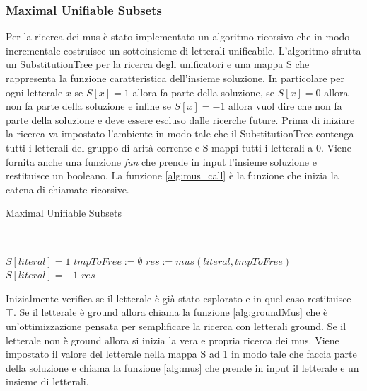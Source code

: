 \documentclass[./main.tex]{subfiles}
\begin{document}
\subsubsection{Maximal Unifiable Subsets}

Per la ricerca dei mus è stato implementato un algoritmo ricorsivo che in modo incrementale costruisce un sottoinsieme di letterali unificabile.
L'algoritmo sfrutta un SubstitutionTree per la ricerca degli unificatori e una mappa S che rappresenta la funzione caratteristica 
dell'insieme soluzione. 
In particolare per ogni letterale $x$ se $S[x] = 1$ allora fa parte della soluzione, se $S[x] = 0$ allora non fa parte della soluzione
e infine se $S[x] = -1$ allora vuol dire che non fa parte della soluzione e deve essere escluso dalle ricerche future.
Prima di iniziare la ricerca va impostato l'ambiente in modo tale che il SubstitutionTree contenga tutti i letterali 
del gruppo di arità corrente e S mappi tutti i letterali a 0. 
Viene fornita anche una funzione \textit{fun} che prende in input l'insieme soluzione e restituisce un booleano.
La funzione \ref{alg:mus_call} è la funzione che inizia la catena di chiamate ricorsive. 






\begin{algorithm}[H] \label{alg:mus_call}
    \caption{Maximal Unifiable Subsets}
    \\

\nl {}
\nl {}

$S[literal] = 1$\;
$tmpToFree := \emptyset$\;
$res := mus(literal, tmpToFree)$\;
$S[literal] = -1$\;
\Return $res$\;
\end{algorithm}

Inizialmente verifica se il letterale è già stato esplorato e in quel caso restituisce $\top$.
Se il letterale è ground allora chiama la funzione \ref{alg:groundMus} che è un'ottimizzazione pensata 
per semplificare la ricerca con letterali ground.
Se il letterale non è ground allora si inizia la vera e propria ricerca dei mus.
Viene impostato il valore del letterale nella mappa S ad 1 in modo tale che faccia parte della soluzione 
e chiama la funzione \ref{alg:mus} che prende in input il letterale e un insieme di letterali.
\end{document}
